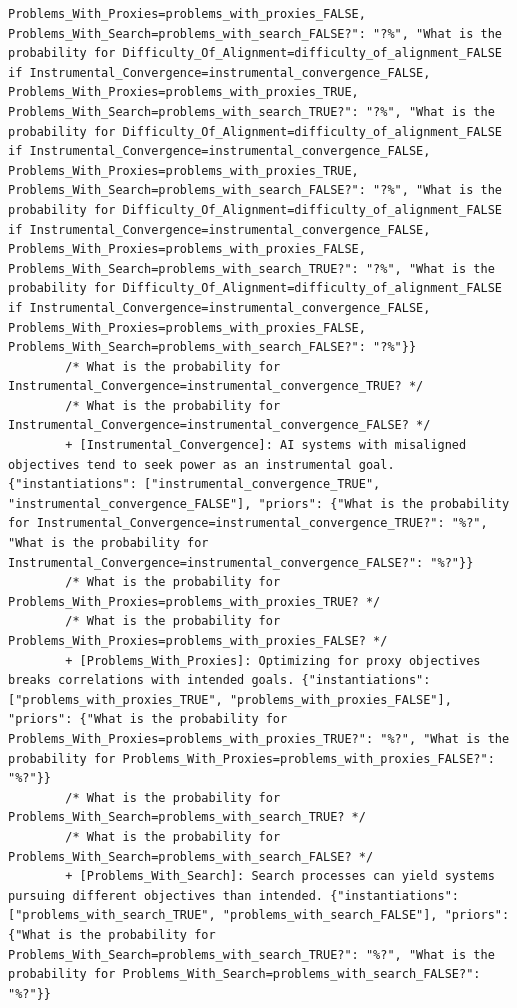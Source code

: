 \documentclass[
  11pt,
  letterpaper,
]{book}
\begin{document}
\begin{landscape}
\begin{verbatim}
Problems_With_Proxies=problems_with_proxies_FALSE, Problems_With_Search=problems_with_search_FALSE?": "?%", "What is the probability for Difficulty_Of_Alignment=difficulty_of_alignment_FALSE if Instrumental_Convergence=instrumental_convergence_FALSE, Problems_With_Proxies=problems_with_proxies_TRUE, Problems_With_Search=problems_with_search_TRUE?": "?%", "What is the probability for Difficulty_Of_Alignment=difficulty_of_alignment_FALSE if Instrumental_Convergence=instrumental_convergence_FALSE, Problems_With_Proxies=problems_with_proxies_TRUE, Problems_With_Search=problems_with_search_FALSE?": "?%", "What is the probability for Difficulty_Of_Alignment=difficulty_of_alignment_FALSE if Instrumental_Convergence=instrumental_convergence_FALSE, Problems_With_Proxies=problems_with_proxies_FALSE, Problems_With_Search=problems_with_search_TRUE?": "?%", "What is the probability for Difficulty_Of_Alignment=difficulty_of_alignment_FALSE if Instrumental_Convergence=instrumental_convergence_FALSE, Problems_With_Proxies=problems_with_proxies_FALSE, Problems_With_Search=problems_with_search_FALSE?": "?%"}}
        /* What is the probability for Instrumental_Convergence=instrumental_convergence_TRUE? */
        /* What is the probability for Instrumental_Convergence=instrumental_convergence_FALSE? */
        + [Instrumental_Convergence]: AI systems with misaligned objectives tend to seek power as an instrumental goal. {"instantiations": ["instrumental_convergence_TRUE", "instrumental_convergence_FALSE"], "priors": {"What is the probability for Instrumental_Convergence=instrumental_convergence_TRUE?": "%?", "What is the probability for Instrumental_Convergence=instrumental_convergence_FALSE?": "%?"}}
        /* What is the probability for Problems_With_Proxies=problems_with_proxies_TRUE? */
        /* What is the probability for Problems_With_Proxies=problems_with_proxies_FALSE? */
        + [Problems_With_Proxies]: Optimizing for proxy objectives breaks correlations with intended goals. {"instantiations": ["problems_with_proxies_TRUE", "problems_with_proxies_FALSE"], "priors": {"What is the probability for Problems_With_Proxies=problems_with_proxies_TRUE?": "%?", "What is the probability for Problems_With_Proxies=problems_with_proxies_FALSE?": "%?"}}
        /* What is the probability for Problems_With_Search=problems_with_search_TRUE? */
        /* What is the probability for Problems_With_Search=problems_with_search_FALSE? */
        + [Problems_With_Search]: Search processes can yield systems pursuing different objectives than intended. {"instantiations": ["problems_with_search_TRUE", "problems_with_search_FALSE"], "priors": {"What is the probability for Problems_With_Search=problems_with_search_TRUE?": "%?", "What is the probability for Problems_With_Search=problems_with_search_FALSE?": "%?"}}

\end{verbatim}
\end{landscape}
\end{document}
